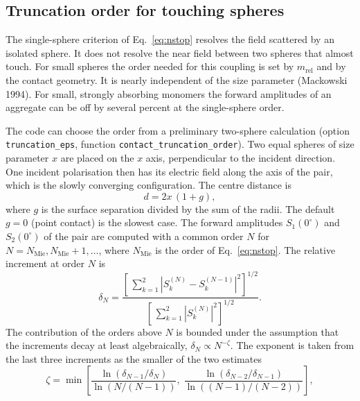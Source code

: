 \documentclass[11pt,a4paper]{article}
\begin{document}
\subsection{Truncation order for touching spheres}
\label{sec:contact-order}

The single-sphere criterion of Eq.~\eqref{eq:nstop} resolves the field scattered by an isolated sphere.
It does not resolve the near field between two spheres that almost touch.
For small spheres the order needed for this coupling is set by $m_\mathrm{rel}$ and by the contact geometry.
It is nearly independent of the size parameter (Mackowski 1994).
For small, strongly absorbing monomers the forward amplitudes of an aggregate can be off by several percent at the single-sphere order.

The code can choose the order from a preliminary two-sphere calculation (option \texttt{truncation\_eps}, function \texttt{contact\_truncation\_order}).
Two equal spheres of size parameter $x$ are placed on the $x$ axis, perpendicular to the incident direction.
One incident polarisation then has its electric field along the axis of the pair, which is the slowly converging configuration.
The centre distance is
\begin{equation}
  d = 2x\,(1 + g),
  \label{eq:contact-distance}
\end{equation}
where $g$ is the surface separation divided by the sum of the radii.
The default $g = 0$ (point contact) is the slowest case.
The forward amplitudes $S_1(0^\circ)$ and $S_2(0^\circ)$ of the pair are computed with a common order $N$ for $N = N_\mathrm{Mie}, N_\mathrm{Mie}+1, \dots$, where $N_\mathrm{Mie}$ is the order of Eq.~\eqref{eq:nstop}.
The relative increment at order $N$ is
\begin{equation}
  \delta_N = \frac{\left[\,\sum_{k=1}^{2} \left|S_k^{(N)} - S_k^{(N-1)}\right|^2\right]^{1/2}}
                  {\left[\,\sum_{k=1}^{2} \left|S_k^{(N)}\right|^2\right]^{1/2}}.
  \label{eq:contact-increment}
\end{equation}
The contribution of the orders above $N$ is bounded under the assumption that the increments decay at least algebraically, $\delta_N \propto N^{-\zeta}$.
The exponent is taken from the last three increments as the smaller of the two estimates
\begin{equation}
  \zeta = \min\!\left[\frac{\ln(\delta_{N-1}/\delta_N)}{\ln\!\left(N/(N-1)\right)},\;
                 \frac{\ln(\delta_{N-2}/\delta_{N-1})}{\ln\!\left((N-1)/(N-2)\right)}\right],
  \label{eq:contact-exponent}
\end{equation}
\end{document}
